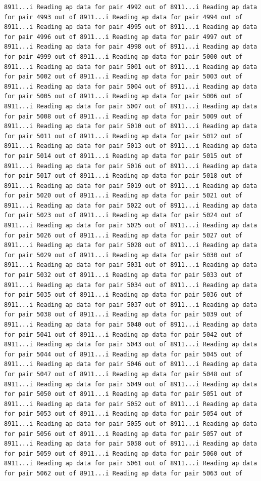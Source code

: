 \documentclass[
]{article}
\begin{document}
\begin{verbatim}
8911...i Reading ap data for pair 4992 out of 8911...i Reading ap data for pair 4993 out of 8911...i Reading ap data for pair 4994 out of 8911...i Reading ap data for pair 4995 out of 8911...i Reading ap data for pair 4996 out of 8911...i Reading ap data for pair 4997 out of 8911...i Reading ap data for pair 4998 out of 8911...i Reading ap data for pair 4999 out of 8911...i Reading ap data for pair 5000 out of 8911...i Reading ap data for pair 5001 out of 8911...i Reading ap data for pair 5002 out of 8911...i Reading ap data for pair 5003 out of 8911...i Reading ap data for pair 5004 out of 8911...i Reading ap data for pair 5005 out of 8911...i Reading ap data for pair 5006 out of 8911...i Reading ap data for pair 5007 out of 8911...i Reading ap data for pair 5008 out of 8911...i Reading ap data for pair 5009 out of 8911...i Reading ap data for pair 5010 out of 8911...i Reading ap data for pair 5011 out of 8911...i Reading ap data for pair 5012 out of 8911...i Reading ap data for pair 5013 out of 8911...i Reading ap data for pair 5014 out of 8911...i Reading ap data for pair 5015 out of 8911...i Reading ap data for pair 5016 out of 8911...i Reading ap data for pair 5017 out of 8911...i Reading ap data for pair 5018 out of 8911...i Reading ap data for pair 5019 out of 8911...i Reading ap data for pair 5020 out of 8911...i Reading ap data for pair 5021 out of 8911...i Reading ap data for pair 5022 out of 8911...i Reading ap data for pair 5023 out of 8911...i Reading ap data for pair 5024 out of 8911...i Reading ap data for pair 5025 out of 8911...i Reading ap data for pair 5026 out of 8911...i Reading ap data for pair 5027 out of 8911...i Reading ap data for pair 5028 out of 8911...i Reading ap data for pair 5029 out of 8911...i Reading ap data for pair 5030 out of 8911...i Reading ap data for pair 5031 out of 8911...i Reading ap data for pair 5032 out of 8911...i Reading ap data for pair 5033 out of 8911...i Reading ap data for pair 5034 out of 8911...i Reading ap data for pair 5035 out of 8911...i Reading ap data for pair 5036 out of 8911...i Reading ap data for pair 5037 out of 8911...i Reading ap data for pair 5038 out of 8911...i Reading ap data for pair 5039 out of 8911...i Reading ap data for pair 5040 out of 8911...i Reading ap data for pair 5041 out of 8911...i Reading ap data for pair 5042 out of 8911...i Reading ap data for pair 5043 out of 8911...i Reading ap data for pair 5044 out of 8911...i Reading ap data for pair 5045 out of 8911...i Reading ap data for pair 5046 out of 8911...i Reading ap data for pair 5047 out of 8911...i Reading ap data for pair 5048 out of 8911...i Reading ap data for pair 5049 out of 8911...i Reading ap data for pair 5050 out of 8911...i Reading ap data for pair 5051 out of 8911...i Reading ap data for pair 5052 out of 8911...i Reading ap data for pair 5053 out of 8911...i Reading ap data for pair 5054 out of 8911...i Reading ap data for pair 5055 out of 8911...i Reading ap data for pair 5056 out of 8911...i Reading ap data for pair 5057 out of 8911...i Reading ap data for pair 5058 out of 8911...i Reading ap data for pair 5059 out of 8911...i Reading ap data for pair 5060 out of 8911...i Reading ap data for pair 5061 out of 8911...i Reading ap data for pair 5062 out of 8911...i Reading ap data for pair 5063 out of 
\end{verbatim}
\end{document}
